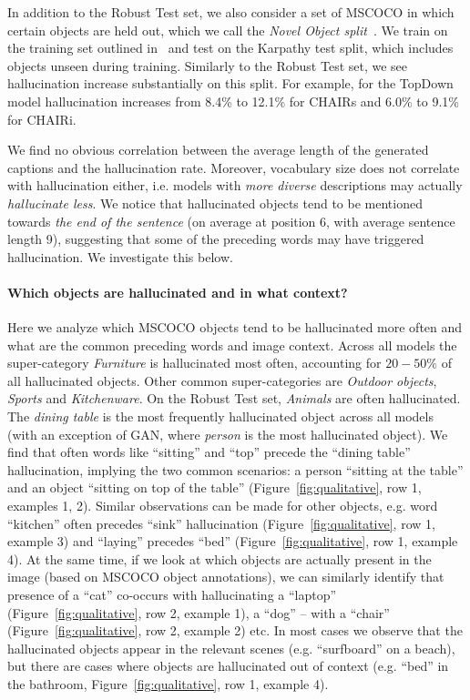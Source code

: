%
In addition to the Robust Test set, we also consider a set of MSCOCO in which certain objects are held out, which we call the \emph{Novel Object split}~\cite{hendricks2016deep}.
We train on the training set outlined in~\cite{hendricks2016deep} and test on the Karpathy test split, which includes objects unseen during training.
Similarly to the Robust Test set, we see hallucination increase substantially on this split.
For example, for the TopDown model hallucination increases from 8.4\% to 12.1\% for CHAIRs and 6.0\% to 9.1\% for CHAIRi.%

We find no obvious correlation between the average length of the generated captions and the hallucination rate. Moreover, vocabulary size does not correlate with hallucination either, i.e. models with \emph{more diverse} descriptions may actually \emph{hallucinate less}. We notice that hallucinated objects tend to be mentioned towards \emph{the end of the sentence} (on average at position 6, with average sentence length 9), suggesting that some of the preceding words may have triggered hallucination. We investigate this below.


\paragraph{Which objects are hallucinated and in what context?}
Here we analyze which MSCOCO objects tend to be hallucinated more often and what are the common preceding words and  image context. %
Across all models the super-category \emph{Furniture} is hallucinated most often, accounting for $20 - 50\%$ of all hallucinated objects. Other common super-categories are \emph{Outdoor objects}, \emph{Sports} and \emph{Kitchenware}. On the Robust Test set, \emph{Animals} are often hallucinated. The \emph{dining table} is the most frequently hallucinated object across all models (with an exception of GAN, where \emph{person} is the most hallucinated object). We find that often words like ``sitting'' and ``top'' precede the ``dining table'' hallucination, implying the two common scenarios: a person ``sitting at the table'' and an object ``sitting on top of the table'' (Figure~\ref{fig:qualitative}, row 1, examples 1, 2). Similar observations can be made for other objects, e.g. word ``kitchen'' often precedes ``sink'' hallucination (Figure~\ref{fig:qualitative}, row 1, example 3) and ``laying'' precedes ``bed'' (Figure~\ref{fig:qualitative}, row 1, example 4). 
At the same time, if we look at which objects are actually present in the image (based on MSCOCO object annotations), we can similarly identify that presence of a ``cat'' co-occurs with hallucinating a ``laptop'' (Figure~\ref{fig:qualitative}, row 2, example 1), a ``dog'' -- with a ``chair'' (Figure~\ref{fig:qualitative}, row 2, example 2) etc. In most cases we observe that the hallucinated objects appear in the relevant scenes (e.g. ``surfboard'' on a beach), but there are cases where objects are hallucinated out of context (e.g. ``bed'' in the bathroom, Figure~\ref{fig:qualitative}, row 1, example 4). 



